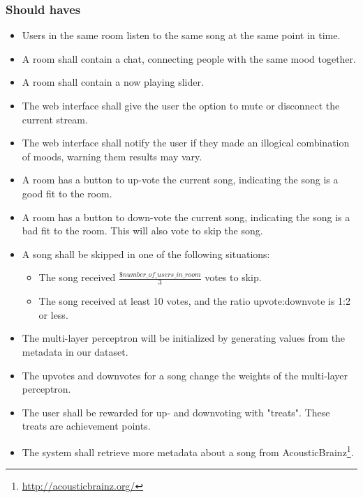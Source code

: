 \subsubsection{Should haves}
\begin{itemize}
\item Users in the same room listen to the same song at the same point in time.

\item A room shall contain a chat, connecting people with the same mood together.

\item A room shall contain a now playing slider.

\item The web interface shall give the user the option to mute or disconnect the current stream.

\item The web interface shall notify the user if they made an illogical combination of moods, warning them results may vary.

\item A room has a button to up-vote the current song, indicating the song is a good fit to the room.

\item A room has a button to down-vote the current song, indicating the song is a bad fit to the room. This will also vote to skip the song.

\item A song shall be skipped in one of the following situations:
	\begin{itemize}
	\item The song received $\frac{\$number\_of\_users\_in\_room}{3}$ votes to skip.
	\item The song received at least 10 votes, and the ratio upvote:downvote is 1:2 or less.
	\end{itemize}

\item The multi-layer perceptron will be initialized by generating values from the metadata in our dataset.

\item The upvotes and downvotes for a song change the weights of the multi-layer perceptron.

\item The user shall be rewarded for up- and downvoting with "treats". These treats are achievement points.

\item The system shall retrieve more metadata about a song from AcousticBrainz\footnote{\url{http://acousticbrainz.org/}}.

\end{itemize}


